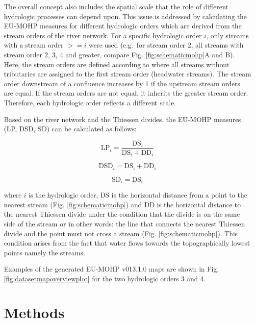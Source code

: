 \documentclass[fleqn,10pt]{wlscirep}
\begin{document}
The overall concept also includes the spatial scale that the role of different hydrologic processes can depend upon. This issue is addressed by calculating the EU-MOHP measures for different hydrologic orders which are derived from the stream orders of the river network. For a specific hydrologic order \(i\), only streams with a stream order \(>= i\) were used (e.g.~for stream order 2, all streams with stream order 2, 3, 4 and greater, compare Fig. \ref{fig:schematicmohp}A and B). Here, the stream orders are defined according to \cite{strahler_quantitative_1957} where all streams without tributaries are assigned to the first stream order (headwater streams). The stream order downstream of a confluence increases by 1 if the upstream stream orders are equal. If the stream orders are not equal, it inherits the greater stream order. Therefore, each hydrologic order reflects a different scale.

Based on the river network and the Thiessen divides, the EU-MOHP measures (LP, DSD, SD) can be calculated as follows:

\begin{equation}
\text{LP}_i = \frac{\text{DS}_i}{\text{DS}_i + \text{DD}_i} \label{eq:eqlp}
\end{equation}

\begin{equation}
\text{DSD}_i = \text{DS}_i + \text{DD}_i \label{eq:eqdsd}
\end{equation}

\begin{equation}
\text{SD}_i = \text{DS}_i \label{eq:eqsd}
\end{equation}

\noindent
where \(i\) is the hydrologic order, DS is the horizontal distance from a point to the nearest stream (Fig. \ref{fig:schematicmohp}) and DD is the horizontal distance to the nearest Thiessen divide under the condition that the divide is on the same side of the stream or in other words: the line that connects the nearest Thiessen divide and the point must not cross a stream (Fig. \ref{fig:schematicmohp}). This condition arises from the fact that water flows towards the topographically lowest points namely the streams.

Examples of the generated EU-MOHP v013.1.0 maps are shown in Fig. \ref{fig:datasetmapoverviewplot} for the two hydrologic orders 3 and 4.

\hypertarget{methods}{%
\section*{Methods}\label{methods}}
\end{document}
